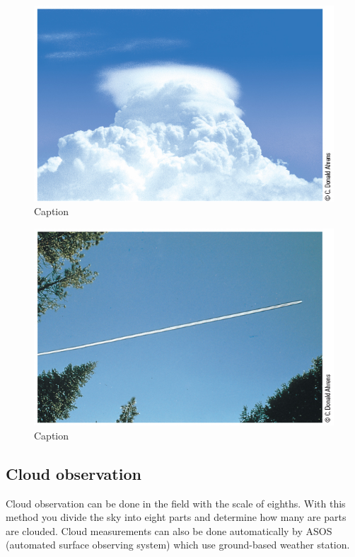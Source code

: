 \documentclass[12pt,oneside]{book}
\begin{document}
\begin{figure}

{\centering \includegraphics[width=0.8\linewidth]{figures/Figure261} 

}

\caption{Caption}\label{fig:CLOUD15}
\end{figure}

\begin{figure}

{\centering \includegraphics[width=0.8\linewidth]{figures/Figure262} 

}

\caption{Caption}\label{fig:CLOUD16}
\end{figure}

\subsection{Cloud observation}\label{cloud-observation}

Cloud observation can be done in the field with the scale of eighths.
With this method you divide the sky into eight parts and determine how
many are parts are clouded. Cloud measurements can also be done
automatically by ASOS (automated surface observing system) which use
ground-based weather station.
\end{document}
